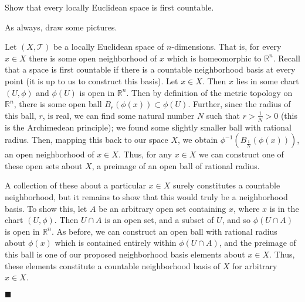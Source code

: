\documentclass[12pt]{article}
\renewcommand{\qed}{\hfill$\blacksquare$}
\renewenvironment{proof}{\begin{addmargin}[1em]{0em}\begin{newproof}}{\end{newproof}\end{addmargin}\qed}
\newenvironment{problem}[2][Problem]{\begin{trivlist}
\item[\hskip \labelsep {\bfseries #1}\hskip \labelsep {\bfseries #2.}]}{\end{trivlist}}
\begin{document}
\begin{problem}{2-21}
Show that every locally Euclidean space is first countable.
\end{problem}
{\color{red} As always, draw some pictures.}\\
\begin{proof}
Let $\left(X,\mathcal{T}\right)$ be a locally Euclidean space of $n$-dimensions. That is, for every $x\in X$ there is some open neighborhood of $x$ which is homeomorphic to $\mathbb{R}^n$. Recall that a space is first countable if there is a countable neighborhood basis at every point (it is up to us to construct this basis). Let $x \in X$. Then $x$ lies in some chart $\left(U,\phi\right)$ and $\phi\left(U\right)$ is open in $\mathbb{R}^n$. Then by definition of the metric topology on $\mathbb{R}^n$, there is some open ball $B_r\left(\phi\left(x\right)\right) \subset \phi\left(U\right)$. Further, since the radius of this ball, $r$, is real, we can find some natural number $N$ such that $r > \frac{1}{N} > 0$ {\color{red} (this is the Archimedean principle)}; we found some slightly smaller ball with rational radius. Then, mapping this back to our space $X$, we obtain $\phi^{-1}\left( B_{\frac{1}{N}}\left(\phi\left(x\right)\right)\right)$, an open neighborhood of $x \in X$. Thus, for any $x\in X$ we can construct one of these open sets about $X$, a preimage of an open ball of rational radius.

A collection of these about a particular $x\in X$ surely constitutes a countable neighborhood, but it remains to show that this would truly be a neighborhood basis. To show this, let $A$ be an arbitrary open set containing $x$, where $x$ is in the chart $\left(U,\phi\right)$. Then $U\cap A$ is an open set, and a subset of $U$, and so $\phi\left(U\cap A\right)$ is open in $\mathbb{R}^n$. As before, we can construct an open ball with rational radius about $\phi\left(x\right)$ which is contained entirely within $\phi\left(U\cap A\right)$, and the preimage of this ball is one of our proposed neighborhood basis elements about $x\in X$. Thus, these elements constitute a countable neighborhood basis of $X$ for arbitrary $x\in X$.
\end{proof}
\end{document}
